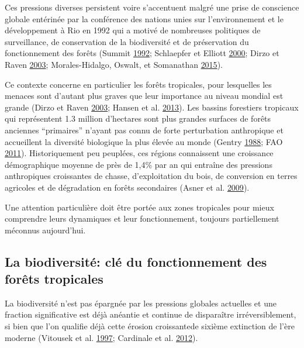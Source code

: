 \documentclass[11pt,french,A4paper,extrafontsizes,onecolumn,openright]{memoir}
\begin{document}
Ces pressions diverses persistent voire s'accentuent malgré une prise de
conscience globale entérinée par la conférence des nations unies sur
l'environnement et le développement à Rio en 1992 qui a motivé de
nombreuses politiques de surveillance, de conservation de la
biodiversité et de préservation du fonctionnement des forêts (Summit
\protect\hyperlink{ref-Summit1992}{1992}; Schlaepfer et Elliott
\protect\hyperlink{ref-Schlaepfer2000}{2000}; Dirzo et Raven
\protect\hyperlink{ref-Dirzo2003a}{2003}; Morales-Hidalgo, Oswalt, et
Somanathan \protect\hyperlink{ref-Morales-Hidalgo2015}{2015}).

Ce contexte concerne en particulier les forêts tropicales, pour
lesquelles les menaces sont d'autant plus graves que leur importance au
niveau mondial est grande (Dirzo et Raven
\protect\hyperlink{ref-Dirzo2003a}{2003}; Hansen et al.
\protect\hyperlink{ref-Hansen2013}{2013}). Les bassins forestiers
tropicaux qui représentent 1.3 million d'hectares sont plus grandes
surfaces de forêts anciennes ``primaires'' n'ayant pas connu de forte
perturbation anthropique et accueillent la diversité biologique la plus
élevée au monde (Gentry \protect\hyperlink{ref-Gentry1988}{1988}; FAO
\protect\hyperlink{ref-FAO2011}{2011}). Historiquement peu peuplées, ces
régions connaissent une croissance démographique moyenne de près de
1,4\% par an qui entraîne des pressions anthropiques croissantes de
chasse, d'exploitation du bois, de conversion en terres agricoles et de
dégradation en forêts secondaires (Asner et al.
\protect\hyperlink{ref-Asner2009}{2009}).

Une attention particulière doit être portée aux zones tropicales pour
mieux comprendre leurs dynamiques et leur fonctionnement, toujours
partiellement méconnus aujourd'hui.

\subsection{La biodiversité: clé du fonctionnement des forêts
tropicales}\label{la-biodiversite-cle-du-fonctionnement-des-forets-tropicales}

La biodiversité n'est pas épargnée par les pressions globales actuelles
et une fraction significative est déjà anéantie et continue de
disparaître irréversiblement, si bien que l'on qualifie déjà cette
érosion croissantede sixième extinction de l'ère moderne (Vitousek et
al. \protect\hyperlink{ref-Vitousek1997}{1997}; Cardinale et al.
\protect\hyperlink{ref-Cardinale2012}{2012}).
\end{document}
